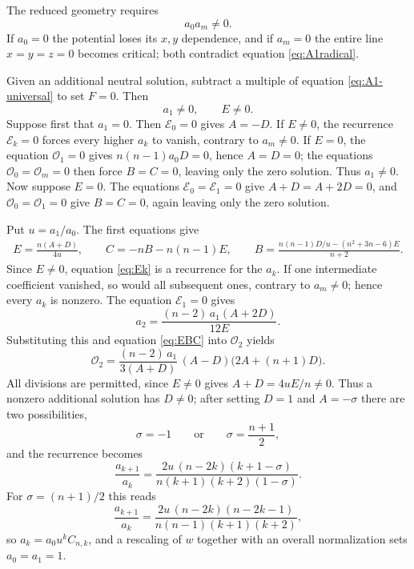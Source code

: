 \documentclass[10pt,reqno]{amsart}
\numberwithin{equation}{section}
\theoremstyle{plain}
\theoremstyle{definition}
\begin{document}
The reduced geometry requires
\begin{equation*}
	a_0a_m\neq0 .
\end{equation*}
If $a_0=0$ the potential loses its $x,y$ dependence, and if $a_m=0$ the entire line $x=y=z=0$ becomes critical; both contradict equation \eqref{eq:A1radical}.

Given an additional neutral solution, subtract a multiple of equation \eqref{eq:A1-universal} to set $F=0$. Then
\begin{equation*}
a_1\neq0,\qquad E\neq0 .
\end{equation*}
Suppose first that $a_1=0$. Then $\mathcal{E}_0=0$ gives $A=-D$. If $E\neq0$, the recurrence $\mathcal{E}_k=0$ forces every higher $a_k$ to vanish, contrary to $a_m\neq0$. If $E=0$, the equation $\mathcal{O}_1=0$ gives $n(n-1)a_0D=0$, hence $A=D=0$; the equations $\mathcal{O}_0=\mathcal{O}_m=0$ then force $B=C=0$, leaving only the zero solution. Thus $a_1\neq0$. Now suppose $E=0$. The equations $\mathcal{E}_0=\mathcal{E}_1=0$ give $A+D=A+2D=0$, and $\mathcal{O}_0=\mathcal{O}_1=0$ give $B=C=0$, again leaving only the zero solution.

Put $u=a_1/a_0$. The first equations give
\begin{equation}\label{eq:EBC}
\begin{gathered}
	E=\frac{n(A+D)}{4u},\qquad C=-nB-n(n-1)E,\qquad B=\frac{n(n-1)D/u-(n^2+3n-6)E}{n+2}.
\end{gathered}
\end{equation}
Since $E\neq0$, equation \eqref{eq:Ek} is a recurrence for the $a_k$. If one intermediate coefficient vanished, so would all subsequent ones, contrary to $a_m\neq0$; hence every $a_k$ is nonzero. The equation $\mathcal{E}_1=0$ gives
\begin{equation*}
	a_2=\frac{(n-2)\,a_1(A+2D)}{12E}.
\end{equation*}
Substituting this and equation \eqref{eq:EBC} into $\mathcal{O}_2$ yields
\begin{equation*}
	\mathcal{O}_2=\frac{(n-2)\,a_1}{3(A+D)}\,(A-D)\big(2A+(n+1)D\big).
\end{equation*}
All divisions are permitted, since $E\neq0$ gives $A+D=4uE/n\neq0$. Thus a nonzero additional solution has $D\neq0$; after setting $D=1$ and $A=-\sigma$ there are two possibilities,
\begin{equation*}
	\sigma=-1\qquad\text{or}\qquad\sigma=\frac{n+1}2 ,
\end{equation*}
and the recurrence becomes
\begin{equation*}
	\frac{a_{k+1}}{a_k}=\frac{2u\,(n-2k)(k+1-\sigma)}{n(k+1)(k+2)(1-\sigma)} .
\end{equation*}
For $\sigma=(n+1)/2$ this reads
\begin{equation*}
	\frac{a_{k+1}}{a_k}=\frac{2u\,(n-2k)(n-2k-1)}{n(n-1)(k+1)(k+2)},
\end{equation*}
so $a_k=a_0u^kC_{n,k}$, and a rescaling of $w$ together with an overall normalization sets $a_0=a_1=1$.
\end{document}
